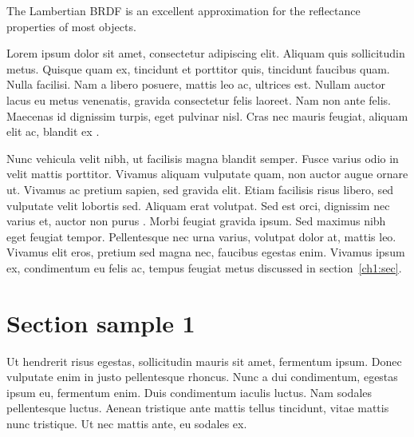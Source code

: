     
    
    





    
    
    
    






    





The Lambertian BRDF is an excellent approximation for the reflectance properties of most objects.









Lorem ipsum dolor sit amet, consectetur adipiscing elit. Aliquam quis sollicitudin metus. Quisque quam ex, tincidunt et porttitor quis, tincidunt faucibus quam. Nulla facilisi. Nam a libero posuere, mattis leo ac, ultrices est. Nullam auctor lacus eu metus venenatis, gravida consectetur felis laoreet. Nam non ante felis. Maecenas id dignissim turpis, eget pulvinar nisl. Cras nec mauris feugiat, aliquam elit ac, blandit ex \cite{article-full}.

Nunc vehicula velit nibh, ut facilisis magna blandit semper. Fusce varius odio in velit mattis porttitor. Vivamus aliquam vulputate quam, non auctor augue ornare ut. Vivamus ac pretium sapien, sed gravida elit. Etiam facilisis risus libero, sed vulputate velit lobortis sed. Aliquam erat volutpat. Sed est orci, dignissim nec varius et, auctor non purus \cite{proceedings-minimal,phdthesis-full}. Morbi feugiat gravida ipsum. Sed maximus nibh eget feugiat tempor. Pellentesque nec urna varius, volutpat dolor at, mattis leo. Vivamus elit eros, pretium sed magna nec, faucibus egestas enim. Vivamus ipsum ex, condimentum eu felis ac, tempus feugiat metus discussed in section~\ref{ch1:sec}.

\section{Section sample 1}

Ut hendrerit risus egestas, sollicitudin mauris sit amet, fermentum ipsum. Donec vulputate enim in justo pellentesque rhoncus. Nunc a dui condimentum, egestas ipsum eu, fermentum enim. Duis condimentum iaculis luctus. Nam sodales pellentesque luctus. Aenean tristique ante mattis tellus tincidunt, vitae mattis nunc tristique. Ut nec mattis ante, eu sodales ex.

